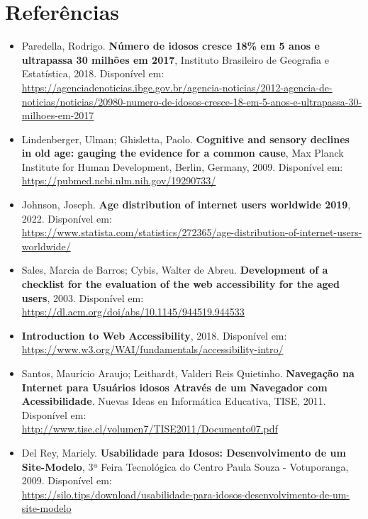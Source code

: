 \documentclass[12pt]{article}
\begin{document}
\section{Referências}

\begin{itemize}
    \item 
    Paredella, Rodrigo. \textbf{Número de idosos cresce 18\% em 5 anos e ultrapassa 30 milhões em 2017}, Instituto Brasileiro de Geografia e Estatística, 2018. Disponível em:   \\   
    \url{https://agenciadenoticias.ibge.gov.br/agencia-noticias/2012-agencia-de-noticias/noticias/20980-numero-de-idosos-cresce-18-em-5-anos-e-ultrapassa-30-milhoes-em-2017}
    
    \item
    Lindenberger, Ulman; Ghisletta, Paolo. \textbf{Cognitive and sensory declines in old age: gauging the evidence for a common cause}, Max Planck Institute for Human Development, Berlin, Germany, 2009.  Disponível em:  \\
    \url{https://pubmed.ncbi.nlm.nih.gov/19290733/}
    
    \item
    Johnson, Joseph. \textbf{Age distribution of internet users worldwide 2019}, 2022. Disponível em:  \\
    \url{https://www.statista.com/statistics/272365/age-distribution-of-internet-users-worldwide/}

    \item 
    Sales, Marcia de Barros; Cybis, Walter de Abreu. \textbf{Development of a checklist for the evaluation of the web accessibility for the aged users}, 2003. Disponível em:     \\
    \url{https://dl.acm.org/doi/abs/10.1145/944519.944533}
    
    \item
    \textbf{Introduction to Web Accessibility}, 2018. Disponível em:  \\
    \url{https://www.w3.org/WAI/fundamentals/accessibility-intro/}
    
    \item
    Santos, Maurício Araujo; Leithardt, Valderi Reis Quietinho. \textbf{Navegação na Internet para Usuários idosos Através de um Navegador com Acessibilidade}. Nuevas Ideas en Informática Educativa, TISE, 2011. Disponível em:  \\ 
    \url{http://www.tise.cl/volumen7/TISE2011/Documento07.pdf}
    
    \item
    Del Rey, Mariely. \textbf{Usabilidade para Idosos: Desenvolvimento de um Site-Modelo}, 3ª Feira Tecnológica do Centro Paula Souza - Votuporanga, 2009. Disponível em:    \\ 
    \url{https://silo.tips/download/usabilidade-para-idosos-desenvolvimento-de-um-site-modelo}


\end{itemize}
\end{document}
